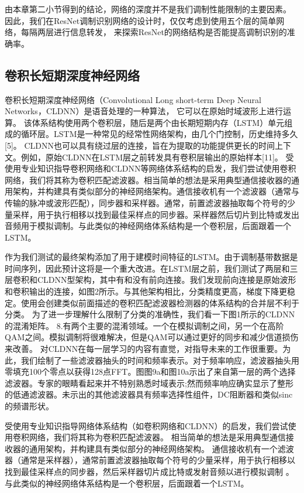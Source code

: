 由本章第二小节得到的结论，网络的深度并不是我们调制性能限制的主要因素。
因此，我们在ResNet调制识别网络的设计时，仅仅考虑到使用五个层的简单网络，每隔两层进行信息转发，
来探索ResNet的网络结构是否能提高调制识别的准确率。


\subsection{卷积长短期深度神经网络}

卷积长短期深度神经网络（Convolutional Long short-term Deep Neural Networks，CLDNN）是语音处理的一种算法，
它可以在原始时域波形上进行运算。
该体系结构使用两个卷积层，随后是两个由长期短期内存（LSTM）单元组成的循环层。LSTM是一种常见的经常性网络架构，由几个门控制，历史维持多久[5]。 CLDNN也可以具有绕过层的连接，旨在为提取的功能提供更长的时间上下文。例如，原始CLDNN在LSTM层之前转发具有卷积层输出的原始样本[11]。
受使用专业知识指导卷积网络和CLDNN等网络体系结构的启发，我们尝试使用卷积网络，我们将其称为卷积匹配滤波器。相当简单的想法是采用典型通信接收器的通用架构，并构建具有类似部分的神经网络架构。通信接收机有一个滤波器（通常与传输的脉冲或波形匹配），同步器和采样器。通常，前置滤波器抽取每个符号的少量采样，用于执行相移以找到最佳采样点的同步器。采样器然后切片到比特或发出音频用于模拟调制。与此类似的神经网络体系结构是一个卷积层，后面跟着一个LSTM。

作为我们测试的最终架构添加了用于建模时间特征的LSTM。由于调制基带数据是时间序列，因此预计这将是一个重大改进。在LSTM层之前，我们测试了两层和三层卷积和CLDNN型架构，其中有和没有前向连接。我们发现前向连接是原始波形和卷积输出的连接，如图2所示。与其他架构相比，分类精度更高，梯度下降更稳定。使用会创建类似前面描述的卷积匹配滤波器检测器的体系结构的合并层不利于分类。
为了进一步理解什么限制了分类的准确性，我们看一下图1所示的CLDNN的混淆矩阵。 8.有两个主要的混淆领域。一个在模拟调制之间，另一个在高阶QAM之间。模拟调制将很难解决，但是QAM可以通过更好的同步和减少信道损伤来改善。
对CLDNN在每一层学习的内容有直觉，对指导未来的工作很重要。为此，我们绘制了一些滤波器抽头的时间和频率表示。对于频率响应，滤波器抽头用零填充100个零点以获得128点FFT。图图9a和图10a示出了来自第一层的两个选择滤波器。专家的眼睛看起来并不特别熟悉时域表示;然而频率响应确实显示了整形的低通滤波器。未示出的其他滤波器具有频率选择性组件，DC阻断器和类似sinc的频谱形状。



受使用专业知识指导网络体系结构（如卷积网络和CLDNN）的启发，我们尝试使用卷积网络，我们将其称为卷积匹配滤波器。 相当简单的想法是采用典型通信接收器的通用架构，并构建具有类似部分的神经网络架构。 通信接收机有一个滤波器（通常是采样器），通常前置滤波器抽取每个符号的少量采样，用于执行相移以找到最佳采样点的同步器，然后采样器切片成比特或发射音频以进行模拟调制 。与此类似的神经网络体系结构是一个卷积层，后面跟着一个LSTM。\par


